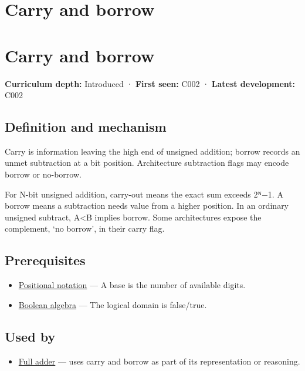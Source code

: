 \hypertarget{appendix-d52d5f78ffd1}{}
\section*{Carry and borrow}
\section{Carry and borrow}\label{carry-and-borrow}

\textbf{Curriculum depth:} Introduced · \textbf{First seen:} C002 · \textbf{Latest development:} C002

\subsection{Definition and mechanism}\label{definition-and-mechanism}

Carry is information leaving the high end of unsigned addition; borrow records an unmet subtraction at a bit position. Architecture subtraction flags may encode borrow or no-borrow.

For N-bit unsigned addition, carry-out means the exact sum exceeds 2ᴺ−1. A borrow means a subtraction needs value from a higher position. In an ordinary unsigned subtract, A\textless B implies borrow. Some architectures expose the complement, `no borrow', in their carry flag.

\subsection{Prerequisites}\label{prerequisites}

\begin{itemize}
\tightlist
\item
  \hyperref[appendix-83c3f28f7bda]{Positional notation} --- A base is the number of available digits.
\item
  \hyperref[appendix-24475e1596a8]{Boolean algebra} --- The logical domain is false/true.
\end{itemize}

\subsection{Used by}\label{used-by}

\begin{itemize}
\tightlist
\item
  \hyperref[appendix-d1a5b1e520c2]{Full adder} --- uses carry and borrow as part of its representation or reasoning.
\end{itemize}

